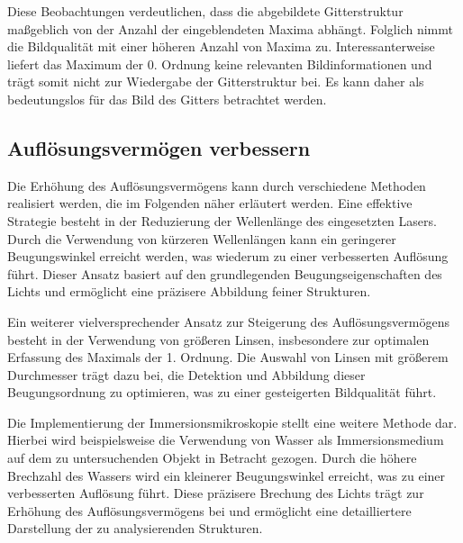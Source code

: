         Diese Beobachtungen verdeutlichen, dass die abgebildete Gitterstruktur maßgeblich von der Anzahl der eingeblendeten Maxima abhängt. Folglich nimmt die Bildqualität mit einer höheren Anzahl von Maxima zu. Interessanterweise liefert das Maximum der 0. Ordnung keine relevanten Bildinformationen und trägt somit nicht zur Wiedergabe der Gitterstruktur bei. Es kann daher als bedeutungslos für das Bild des Gitters betrachtet werden.

    \subsection{Auflösungsvermögen verbessern}
    
        Die Erhöhung des Auflösungsvermögens kann durch verschiedene Methoden realisiert werden, die im Folgenden näher erläutert werden. Eine effektive Strategie besteht in der Reduzierung der Wellenlänge des eingesetzten Lasers. Durch die Verwendung von kürzeren Wellenlängen kann ein geringerer Beugungswinkel erreicht werden, was wiederum zu einer verbesserten Auflösung führt. Dieser Ansatz basiert auf den grundlegenden Beugungseigenschaften des Lichts und ermöglicht eine präzisere Abbildung feiner Strukturen.

        Ein weiterer vielversprechender Ansatz zur Steigerung des Auflösungsvermögens besteht in der Verwendung von größeren Linsen, insbesondere zur optimalen Erfassung des Maximals der 1. Ordnung. Die Auswahl von Linsen mit größerem Durchmesser trägt dazu bei, die Detektion und Abbildung dieser Beugungsordnung zu optimieren, was zu einer gesteigerten Bildqualität führt.

        Die Implementierung der Immersionsmikroskopie stellt eine weitere Methode dar. Hierbei wird beispielsweise die Verwendung von Wasser als Immersionsmedium auf dem zu untersuchenden Objekt in Betracht gezogen. Durch die höhere Brechzahl des Wassers wird ein kleinerer Beugungswinkel erreicht, was zu einer verbesserten Auflösung führt. Diese präzisere Brechung des Lichts trägt zur Erhöhung des Auflösungsvermögens bei und ermöglicht eine detailliertere Darstellung der zu analysierenden Strukturen.

